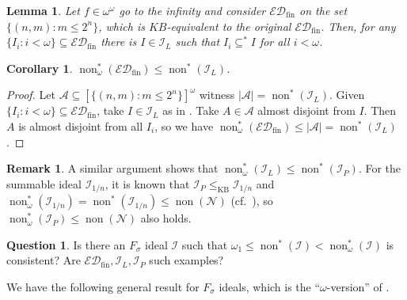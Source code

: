 \documentclass[a4paper,12pt]{amsart}
\newtheorem{lem}[thm]{Lemma}
\newtheorem{cor}[thm]{Corollary}
\theoremstyle{definition}
\newtheorem{rem}[thm]{Remark}
\newtheorem{que}[thm]{Question}
\numberwithin{thm}{section}
\numberwithin{equation}{section}
\newcommand{\oo}{{\omega}^\omega}
\newcommand{\n}{\mathcal{N}}
\DeclareMathOperator{\non}{non}
\newcommand{\I}{\mathscr{I}}
\newcommand{\edfin}{\mathcal{ED}_\mathrm{fin}}
\newcommand{\IL}{\I_{L}}
\begin{document}
    \begin{lem}\label{lem:EDfin_Linear}
         Let $f\in\oo$ go to the infinity and consider $\edfin$ on the set $\{(n,m):m\leq2^n\}$, which is $KB$-equivalent to the original $\edfin$.
         Then, for any $\{I_i:i<\omega\}\subseteq\edfin$ there is $I\in\IL$ such that $I_i\subseteq^* I$ for all $i<\omega$. 
    \end{lem}
    
    \begin{cor}
    	$\non^*_\omega(\edfin)\leq\non^*(\IL)$.
    \end{cor}
    \begin{proof}
        Let $\mathcal{A}\subseteq[\{(n,m):m\leq2^n\}]^\omega$ witness $|\mathcal{A}|=\non^*(\I_L)$. Given $\{I_i:i<\omega\}\subseteq\edfin$, take $I\in\IL$ as in . Take $A\in\mathcal{A}$ almost disjoint from $I$. Then $A$ is almost disjoint from all $I_i$, so we have $\non^*_\omega(\edfin)\leq|\mathcal{A}|=\non^*(\IL)$.
    \end{proof}

    \begin{rem}
        A similar argument shows that $\non^*_\omega(\I_L)\leq\non^*(\I_P)$. For the summable ideal $\I_{1/n}$, it is known that $\I_P\leq_{\mathrm{KB}}\I_{1/n}$ and $\non^*_\omega(\I_{1/n}) = \non^*(\I_{1/n}) \leq \non(\n)$ (cf.\ \cite[Theorem 3.7(2)]{HH07}), so $\non^*_\omega(\I_P)\leq\non(\n)$ also holds.
    \end{rem}

    \begin{que}
        Is there an $F_\sigma$ ideal $\I$ such that $\omega_1\leq\non^*(\I)<\non^*_\omega(\I)$ is consistent? Are $\edfin, \I_L, \I_P$ such examples?
    \end{que}

    We have the following general result for $F_\sigma$ ideals, which is the ``$\omega$-version'' of \cite[Corollary 4.6(1)]{HMM10}.
\end{document}

